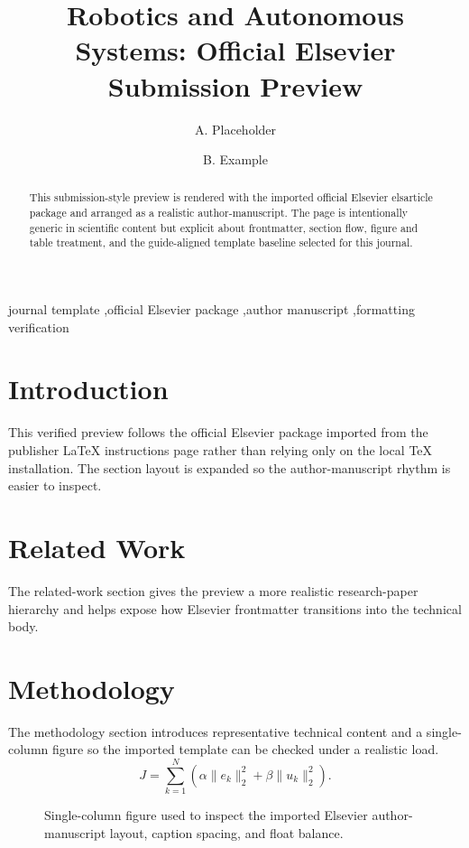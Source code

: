 \documentclass[preprint,12pt]{elsarticle}
\begin{document}
\begin{frontmatter}
\title{Robotics and Autonomous Systems: Official Elsevier Submission Preview}
\author{A. Placeholder}
\author{B. Example}
\address{Department of Verified Templates, Placeholder Institute}
\begin{abstract}
This submission-style preview is rendered with the imported official Elsevier elsarticle package and arranged as a realistic author-manuscript. The page is intentionally generic in scientific content but explicit about frontmatter, section flow, figure and table treatment, and the guide-aligned template baseline selected for this journal.
\end{abstract}
\begin{keyword}
journal template \sep official Elsevier package \sep author manuscript \sep formatting verification
\end{keyword}
\end{frontmatter}
\section{Introduction}
This verified preview follows the official Elsevier package imported from the publisher LaTeX instructions page rather than relying only on the local TeX installation. The section layout is expanded so the author-manuscript rhythm is easier to inspect.
\section{Related Work}
The related-work section gives the preview a more realistic research-paper hierarchy and helps expose how Elsevier frontmatter transitions into the technical body.
\section{Methodology}
The methodology section introduces representative technical content and a single-column figure so the imported template can be checked under a realistic load.
\begin{equation}
J = \sum_{k=1}^{N} \left( \alpha \|e_k\|_2^2 + \beta \|u_k\|_2^2 \right).
\end{equation}
\begin{figure}[t]
\centering
{}
\caption{Single-column figure used to inspect the imported Elsevier author-manuscript layout, caption spacing, and float balance.}
\end{figure}
\end{document}
